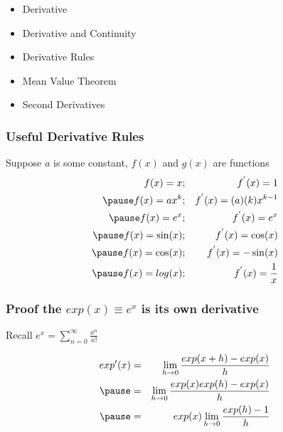 \documentclass[aspectratio=169, handout]{beamer}
\numberwithin{equation}{section}
\begin{document}
\begin{frame}

\begin{itemize}
\item \textcolor{mygray}{Derivative}
\item \textcolor{mygray}{Derivative and Continuity}
\item \textcolor{myblack}{Derivative Rules}
\item \textcolor{mygray}{Mean Value Theorem}
\item \textcolor{mygray}{Second Derivatives}
\end{itemize}

\end{frame}


\begin{frame}
\frametitle{Useful Derivative Rules}

Suppose $a$ is some constant, $f(x)$ and $g(x)$ are functions \pause 
\begin{eqnarray}
f(x) = x & ; & f^{'}(x) = 1 \nonumber \\ \pause 
f(x) = a x^{k} & ; & f^{'}(x) = (a) (k) x ^{k-1} \nonumber \\ \pause 
f(x) = e^{x } & ; & f^{'} (x) = e^{x} \nonumber \\ \pause 
f(x) = \sin(x) & ; & f^{'} (x) = \cos (x) \nonumber \\ \pause 
f(x) = \cos(x) & ; & f^{'} (x) = - \sin(x) \nonumber \\ \pause 
f(x) = log(x) & ; & f^{'} (x) = \frac{1}{x} \nonumber 
\end{eqnarray}

\end{frame}

\begin{frame}
\frametitle{Proof the $exp(x)\equiv e^x$ is its own derivative}

Recall $e^x=\sum_{n=0}^{\infty} \frac{x^n}{n!}$

\begin{eqnarray}
exp'(x) &=& \lim_{h\rightarrow 0} \frac{exp(x+h)-exp(x)}{h} \nonumber\\\pause
&=& \lim_{h\rightarrow 0} \frac{exp(x)exp(h)-exp(x)}{h}\nonumber\\\pause
&=& exp(x)\lim_{h\rightarrow 0} \frac{exp(h)-1}{h}\nonumber
\end{eqnarray}
\pause

\end{frame}
\end{document}
